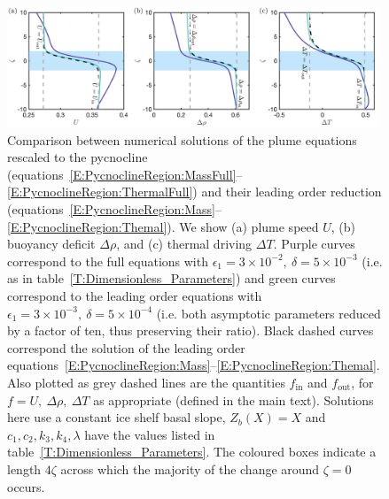 \documentclass[openacc]{rsproca_new}%
\newcommand{\epsone}{\epsilon_{1}} %
\newcommand{\lt}{\delta} %
\renewcommand{\in}{\text{in}} %
\newcommand{\out}{\text{out}}
\begin{document}
\begin{figure}
\centering
\includegraphics[width = 0.99\textwidth]{Submitted_PRSA/make_plots/plots/figure4.pdf}
\caption{Comparison between numerical solutions of the plume equations rescaled to the pycnocline (equations~\eqref{E:PycnoclineRegion:MassFull}--\eqref{E:PycnoclineRegion:ThermalFull}) and their leading order reduction (equations~\eqref{E:PycnoclineRegion:Mass}--\eqref{E:PycnoclineRegion:Themal}). We show (a) plume speed $U$, (b) buoyancy deficit $\Delta \rho$, and (c) thermal driving $\Delta T$. Purple curves correspond to the full equations with $\epsone = 3\times10^{-2}, ~\lt = 5\times10^{-3}$ (i.e. as in table~\ref{T:Dimensionless_Parameters}) and green curves correspond to the leading order equations with $\epsone = 3\times10^{-3},~ \lt = 5\times10^{-4}$ (i.e. both asymptotic parameters reduced by a factor of ten, thus preserving their ratio). Black dashed curves correspond the solution of the leading order equations~\eqref{E:PycnoclineRegion:Mass}--\eqref{E:PycnoclineRegion:Themal}. Also plotted as grey dashed lines are the quantities $f_{\in}$ and $f_{\out}$, for $f = U,~ \Delta \rho, ~\Delta T$ as appropriate (defined in the main text). Solutions here use a constant ice shelf basal slope, $Z_b(X) = X$ and $c_1, c_2, k_3,k_4, \lambda$ have the values listed in table~\ref{T:Dimensionless_Parameters}. The coloured boxes indicate a length $4 \zeta$ across which the majority of the change around $\zeta = 0 $ occurs.}\label{fig:PycnoclineAsymptotics}
\end{figure}
\end{document}
